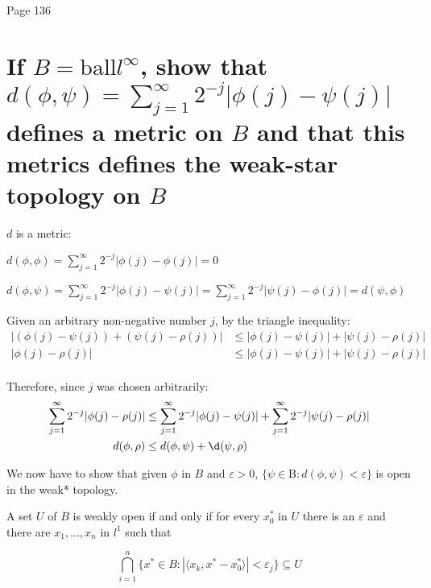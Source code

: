 \documentclass{article}
\begin{document}
Page 136
\section{If $B=\text{ball} l^{\infty}$, show that $d(\phi, \psi) = \sum_{j=1}^{\infty}{2^{-j} | \phi(j) - \psi(j)|}$ defines a metric on $B$ and that this metrics defines the weak-star topology on $B$}

$d$ is a metric:

$d(\phi, \phi) = \sum_{j=1}^{\infty}{2^{-j} | \phi(j) - \phi(j)|} = 0$

$d(\phi, \psi) = \sum_{j=1}^{\infty}{2^{-j} | \phi(j) - \psi(j)|} = \sum_{j=1}^{\infty}{2^{-j} | \psi(j) - \phi(j)|} = d(\psi, \phi)$


Given an arbitrary non-negative number $j$, by the triangle inequality:
\begin{align}
| ( \phi(j) - \psi(j) ) + (\psi(j) - \rho(j) )| &\le | \phi(j) - \psi(j)| +  | \psi(j) - \rho(j)| \\
| \phi(j) - \rho(j)| &\le | \phi(j) - \psi(j)| +  | \psi(j) - \rho(j)| \\
\end{align}

Therefore, since $j$ was chosen arbitrarily:
\begin{align}
\sum_{j=1}^{\infty}{2^{-j} | \phi(j) - \rho(j)|} &\le \sum_{j=1}^{\infty}{2^{-j} | \phi(j) - \psi(j)|} + \sum_{j=1}^{\infty}{2^{-j} | \psi(j) - \rho(j)|} \\
d(\phi, \rho) &\le d(\phi, \psi) + \d(\psi, \rho)
\end{align}

We now have to show that given $\phi$ in $B$ and $\varepsilon>0$,  $\{\psi \in $B$ : d(\phi, \psi) < \varepsilon\}$ is open in the weak* topology.

A set $U$ of $B$ is weakly open if and only if for every $x^*_0$ in $U$ there is an $\varepsilon$ and there are $x_1, ... , x_n$ in $l^1$ such that

$$\bigcap^n_{i=1}\{x^*\in B : |\langle x_k, x^* - x^*_0 \rangle| < \varepsilon_j\} \subseteq U$$
\end{document}
